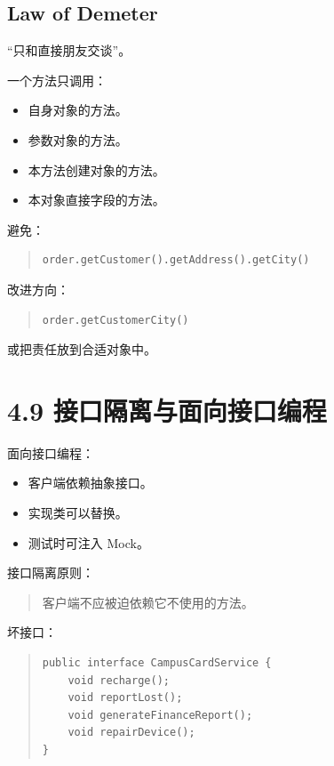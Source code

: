 \documentclass[UTF8,zihao=-4]{ctexart}
\begin{document}
\subsection{Law of Demeter}

“只和直接朋友交谈”。

一个方法只调用：

\begin{itemize}
\item 自身对象的方法。
\item 参数对象的方法。
\item 本方法创建对象的方法。
\item 本对象直接字段的方法。
\end{itemize}

避免：

\begin{quote}
\footnotesize
\begin{verbatim}
order.getCustomer().getAddress().getCity()
\end{verbatim}
\end{quote}

改进方向：

\begin{quote}
\footnotesize
\begin{verbatim}
order.getCustomerCity()
\end{verbatim}
\end{quote}

或把责任放到合适对象中。

\section{4.9 接口隔离与面向接口编程}

面向接口编程：

\begin{itemize}
\item 客户端依赖抽象接口。
\item 实现类可以替换。
\item 测试时可注入 Mock。
\end{itemize}

接口隔离原则：

\begin{quote}
客户端不应被迫依赖它不使用的方法。
\end{quote}

坏接口：

\begin{quote}
\footnotesize
\begin{verbatim}
public interface CampusCardService {
    void recharge();
    void reportLost();
    void generateFinanceReport();
    void repairDevice();
}
\end{verbatim}
\end{quote}
\end{document}
